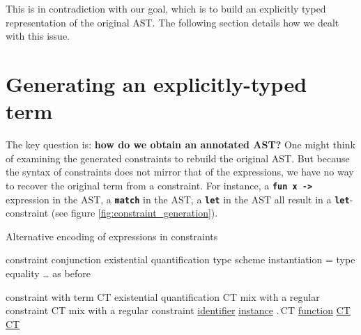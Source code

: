 \documentclass[10pt,a4paper,twoside,titlepage,twocolumn]{article}
\newcommand{\code}[1]{\textbf{\texttt{#1}}}
\begin{document}
This is in contradiction with our goal, which is to build an explicitly typed
representation of the original AST. The following section details how we dealt
with this issue.

\section{Generating an explicitly-typed term}

The key question is: \textbf{how do we obtain an annotated AST?} One might think
of examining the generated constraints to rebuild the original AST. But because
the syntax of constraints does not mirror that of the expressions, we have no
way to recover the original term from a constraint. For instance, a \code{fun x
->} expression in the AST, a \code{match} in the AST, a \code{let} in the AST
all result in a \code{let}-constraint (see figure
\vref{fig:constraint_generation}).

\begin{TTCOMPONENT}{Alternative encoding of expressions in constraints\label{fig:bad_idea}}{}
  \let \\ \TTSyntaxAlternative%

         {constraint} \\
  {\co \wedge \co}                     {conjunction} \\
  {\cexists\tvars\co}                  {existential quantification} \\
  {\ccall\evid\ttyp}                   {type scheme instantiation}\\
  {\ttyp = \ttyp}                      {type equality} \\
  {…}                                  {as before}

  \columnbreak %

       {constraint with term} \\
  {\cexists\tvars CT}                  {existential quantification} \\
  {CT \wedge\co}                  {mix with a regular constraint} \\
  {\co\wedge CT}                  {mix with a regular constraint} \\
  {\underline{\evid}}                  {\underline{identifier}} \\
  {\ccall{\underline{\evid}}\ttyp}                  {\underline{instance}} \\
  {\underline{\efun\evar\ttyp}.\,CT}                  {\underline{function}} \\
  {\underline{CT}\,\,\underline{CT}} {\underline{}} \\
  {\underline{}} {\underline{\smash{\code{let}-binding}}}

  \extraspacehack{.07in}
\end{TTCOMPONENT}
\end{document}
